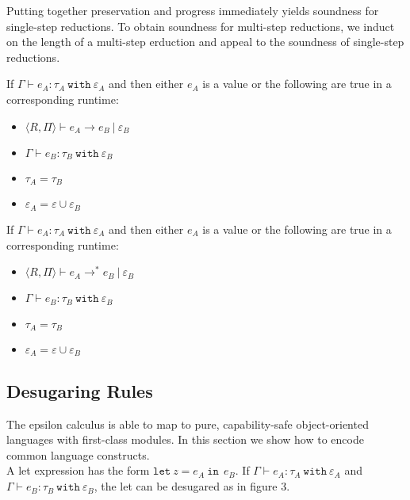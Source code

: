 \documentclass[a4paper,UKenglish]{lipics-v2016}
\newcommand{\kw}[1]{\mathtt{ #1 }~}
\newcommand{\rctx}[0]{ \langle R, \Pi \rangle }
\begin{document}
\noindent
Putting together preservation and progress immediately yields soundness for single-step reductions. To obtain soundness for multi-step reductions, we induct on the length of a multi-step erduction and appeal to the soundness of single-step reductions.

\begin{theorem}
If $\Gamma \vdash e_A: \tau_A~\kw{with} \varepsilon_A$ and then either $e_A$ is a value or the following are true in a corresponding runtime:
\begin{itemize}
	\item $\rctx \vdash e_A \longrightarrow e_B~|~\varepsilon_B$
	\item $\Gamma \vdash e_B: \tau_B~\kw{with} \varepsilon_B$
	\item $\tau_A = \tau_B$
	\item $\varepsilon_A = \varepsilon \cup \varepsilon_B$
\end{itemize}

\end{theorem}

\begin{theorem}
If $\Gamma \vdash e_A: \tau_A~\kw{with} \varepsilon_A$ and then either $e_A$ is a value or the following are true in a corresponding runtime:
\begin{itemize}
	\item $\rctx \vdash e_A \longrightarrow^{*} e_B~|~\varepsilon_B$
	\item $\Gamma \vdash e_B: \tau_B~\kw{with} \varepsilon_B$
	\item $\tau_A = \tau_B$
	\item $\varepsilon_A = \varepsilon \cup \varepsilon_B$
\end{itemize}
\end{theorem}


\subsection{Desugaring Rules}

The epsilon calculus is able to map to pure, capability-safe object-oriented languages with first-class modules. In this section we show how to encode common language constructs. \\

\noindent
A let expression has the form $\kw{let} z = e_A~\kw{in}~e_B$. If $\Gamma \vdash e_A: \tau_A~\kw{with} \varepsilon_A$ and $\Gamma \vdash e_B: \tau_B~\kw{with} \varepsilon_B$, the let can be desugared as in figure 3.
\end{document}
